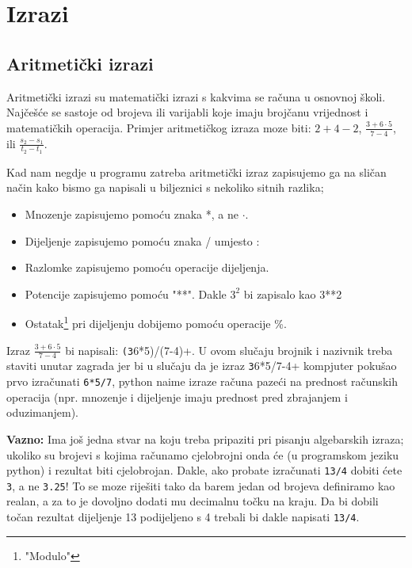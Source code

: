 \chapter{Izrazi}

\section{Aritmetički izrazi}

Aritmetički izrazi su matematički izrazi s kakvima se računa u
osnovnoj školi. Najčešće se sastoje od brojeva ili varijabli
koje imaju brojčanu vrijednost i matematičkih operacija. Primjer
aritmetičkog izraza moze biti: 
$2+4-2$, 
$\displaystyle \frac{3+6\cdot 5}{7-4}$,
ili 
$\displaystyle \frac{s_2-s_1}{t_2-t_1}$. 

Kad nam negdje u programu zatreba
aritmetički izraz zapisujemo ga na sličan način kako bismo ga napisali u
biljeznici s nekoliko sitnih razlika;

\begin{itemize}
	\item Mnozenje zapisujemo pomoću znaka *, a ne $\cdot$.
	\item Dijeljenje zapisujemo pomoću znaka / umjesto :
	\item Razlomke zapisujemo pomoću operacije dijeljenja.
	\item Potencije zapisujemo pomoću "**". Dakle $3^2$ bi zapisalo kao
		3**2
	\item Ostatak\footnote{"Modulo"} pri dijeljenju dobijemo pomoću
		operacije \%.
\end{itemize}

Izraz 
$\displaystyle \frac{3+6\cdot 5}{7-4}$
bi napisali: \verb+(3+6*5)/(7-4)+. U ovom
slučaju brojnik i nazivnik treba staviti unutar zagrada jer bi u
slučaju da je izraz \verb+3+6*5/7-4+ kompjuter pokušao prvo
izračunati \verb+6*5/7+, python naime izraze računa pazeći na
prednost računskih operacija (npr. mnozenje i dijeljenje imaju
prednost pred zbrajanjem i oduzimanjem).

\textbf{Vazno:}
Ima još jedna stvar na koju treba pripaziti pri pisanju algebarskih
izraza; ukoliko su brojevi s kojima računamo cjelobrojni onda će (u
programskom jeziku python) i rezultat biti cjelobrojan. Dakle, ako probate
izračunati \verb+13/4+ dobiti ćete \verb+3+, a ne \verb+3.25+! To se
moze riješiti tako da barem jedan od brojeva definiramo kao realan, a za
to je dovoljno dodati mu decimalnu točku na kraju. Da bi dobili točan
rezultat dijeljenje 13 podijeljeno s 4 trebali bi dakle napisati
\verb+13/4+.

